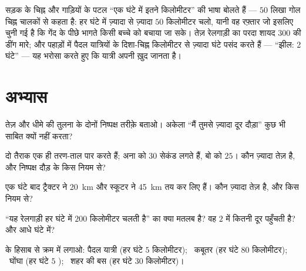 \begin{example}[आस-पास की चालें पढ़ना]\label{ex:g5:speed-distance-time:signs}
सड़क के चिह्न और गाड़ियों के पटल ``एक घंटे में इतने किलोमीटर'' की
भाषा बोलते हैं --- $50$ लिखा गोल चिह्न चालकों से कहता है: हर घंटे में
ज़्यादा से ज़्यादा $50$ किलोमीटर चलो, यानी वह रफ़्तार जो इसलिए चुनी गई
है कि गेंद के पीछे भागते किसी बच्चे को बचाया जा सके। तेज़ रेलगाड़ी का
परदा शायद $300$ की डींग मारे; और पहाड़ों में पैदल यात्रियों के दिशा-चिह्न
किलोमीटर से ज़्यादा घंटे पसंद करते हैं --- ``झील: 2 घंटे'' --- यह भरोसा
करते हुए कि यात्री अपनी  ख़ुद जानता है।
\end{example}

\section{अभ्यास}

\begin{exercise}[$\star$]\label{exo:g5:speed-distance-time:1}
तेज़ और धीमे की तुलना के दोनों निष्पक्ष तरीक़े बताओ। अकेला ``मैं
तुमसे ज़्यादा दूर दौड़ा'' कुछ भी साबित क्यों नहीं करता?
\end{exercise}

\begin{exercise}[$\star$]\label{exo:g5:speed-distance-time:2}
दो तैराक एक ही तरण-ताल पार करते हैं; अना को $30$ सेकंड लगते हैं, बो
को $25$। कौन ज़्यादा तेज़ है, और निष्पक्ष दौड़ के किस नियम से?
\end{exercise}

\begin{exercise}[$\star$]\label{exo:g5:speed-distance-time:3}
एक घंटे बाद ट्रैक्टर ने \qty{20}{km} और स्कूटर ने \qty{45}{km} तय
कर लिए हैं। कौन ज़्यादा तेज़ है, और किस नियम से?
\end{exercise}

\begin{exercise}[$\star$]\label{exo:g5:speed-distance-time:4}
``यह रेलगाड़ी हर घंटे में $200$ किलोमीटर चलती है'' का क्या मतलब है?
वह $2$  में कितनी दूर पहुँचती है? और आधे घंटे में?
\end{exercise}

\begin{exercise}[$\star$]\label{exo:g5:speed-distance-time:5}
 के हिसाब से क्रम में लगाओ: पैदल यात्री (हर घंटे $5$ किलोमीटर);
\ कबूतर (हर घंटे $80$ किलोमीटर); \ घोंघा (हर घंटे $5$
\emph{}); \ शहर की बस (हर घंटे $30$ किलोमीटर)।
\end{exercise}

